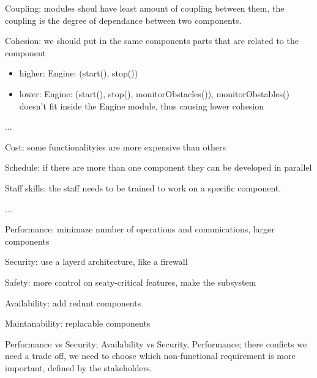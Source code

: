 \documentclass[12pt]{article}
\begin{document}
Coupling: modules shoul have least amount of coupling between them, the coupling is the degree of dependance between two components.


Cohesion: we should put in the same components parts that are related to the component
\begin{itemize}
  \item higher: Engine: (start(), stop())
  \item lower: Engine: (start(), stop(), monitorObstacles()), monitorObstables() doesn't fit inside the Engine module, thus causing lower cohesion
\end{itemize}

...

Cost: some functionalityies are more expensive than others

Schedule: if there are more than one component they can be developed in parallel

Staff skills: the staff needs to be trained to work on a specific component.


...

Performance: minimaze number of operations and comunications, larger components

Security: use a layerd architecture, like a firewall

Safety: more control on seaty-critical features, make the subsystem

Availability: add redunt components

Maintanability: replacable components

Performance vs Security; Availability vs Security, Performance; there conficts we need a trade off, we need to choose which non-functional requirement is more important, defined by the stakeholders.
\end{document}

